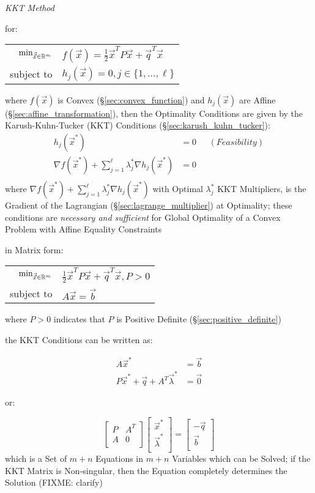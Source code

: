\emph{KKT Method}

for:

\begin{tabular}{r l}
  $\mathrm{min}_{\vec{\vec{x}} \in \mathbb{R}^m}$ &
    $f(\vec{x}) = \frac{1}{2}\vec{x}^T P\vec{x} + \vec{q}^T\vec{x}$ \\
  subject to & $h_j(\vec{x}) = 0, j \in \{1,\ldots,\ell\}$ \\
\end{tabular}

where $f(\vec{x})$ is Convex (\S\ref{sec:convex_function}) and $h_j(\vec{x})$
are Affine (\S\ref{sec:affine_transformation}),
then the Optimality Conditions are given by the Karush-Kuhn-Tucker (KKT)
Conditions (\S\ref{sec:karush_kuhn_tucker}):
\begin{align*}
  h_j(\vec{x}^*) & = 0 & \ \ \ (Feasibility) \\
  \nabla f(\vec{x}^*) +
    \sum_{j=1}^\ell \lambda_j^* \nabla h_j(\vec{x}^*) & = 0 & \\
\end{align*}
where $\nabla f(\vec{x}^*) + \sum_{j=1}^\ell \lambda^*_j \nabla h_j(\vec{x}^*)$
with Optimal $\lambda^*_j$ KKT Multipliers, is the Gradient of the Lagrangian
(\S\ref{sec:lagrange_multiplier}) at Optimality;
these conditions are \emph{necessary and sufficient} for Global Optimality of a
Convex Problem with Affine Equality Constraints

in Matrix form:

\begin{tabular}{r l}
  $\mathrm{min}_{\vec{\vec{x}} \in \mathbb{R}^m}$ &
    $\frac{1}{2}\vec{x}^T P\vec{x} + \vec{q}^T\vec{x}, P > 0$ \\
  subject to & $A\vec{x} = \vec{b}$ \\
\end{tabular}

where $P > 0$ indicates that $P$ is Positive Definite
(\S\ref{sec:positive_definite})

the KKT Conditions can be written as:

\begin{align*}
  A\vec{x}^*                                & = \vec{b} \\
  P\vec{x}^* + \vec{q} + A^T\vec{\lambda}^* & = \vec{0}
\end{align*}

or:

\[
  \begin{bmatrix}
    P & A^T \\
    A & 0   \\
  \end{bmatrix}
  \begin{bmatrix}
    \vec{x}^*       \\
    \vec{\lambda}^* \\
  \end{bmatrix}
  =
  \begin{bmatrix}
    -\vec{q} \\
    \vec{b}  \\
  \end{bmatrix}
\]
which is a Set of $m + n$ Equations in $m + n$ Variables which can be Solved;
if the KKT Matrix is Non-singular, then the Equation completely determines the
Solution (FIXME: clarify)

